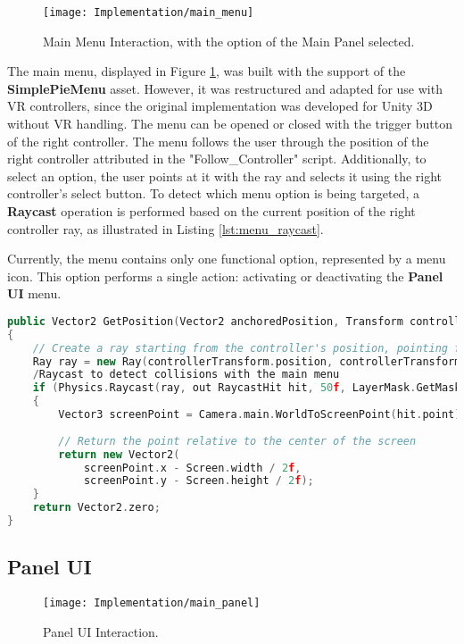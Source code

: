  \begin{figure}[h!]
    \centering
    \texttt{[image: Implementation/main\_menu]}
    \caption{Main Menu Interaction, with the option of the Main Panel selected.}
    \label{fig:main_menu}
\end{figure}

The main menu, displayed in Figure \ref{fig:main_menu}, was built with the support of the \textbf{SimplePieMenu} asset.
However, it was restructured and adapted for use with \gls{VR} controllers, since the original implementation was developed for Unity \gls{3D} without \gls{VR} handling.
The menu can be opened or closed with the trigger button of the right controller. The menu follows the user through the position of the right controller attributed in the "Follow\_Controller" script.
Additionally, to select an option, the user points at it with the ray and selects it using the right controller’s select button. To detect which menu option is being targeted, a \textbf{Raycast} operation is performed based on the current position of the right controller ray, as illustrated in Listing \ref{lst:menu_raycast}.

Currently, the menu contains only one functional option, represented by a menu icon. This option performs a single action: activating or deactivating the \textbf{Panel \gls{UI}} menu.


\begin{lstlisting}[language=C++, caption={Method used to acquire the position that was pointed at by the controller ray.}, label={lst:menu_raycast},float]
public Vector2 GetPosition(Vector2 anchoredPosition, Transform controllerTransform)
{
    // Create a ray starting from the controller's position, pointing forward
    Ray ray = new Ray(controllerTransform.position, controllerTransform.forward);
    /Raycast to detect collisions with the main menu
    if (Physics.Raycast(ray, out RaycastHit hit, 50f, LayerMask.GetMask("Default")))
    {
        Vector3 screenPoint = Camera.main.WorldToScreenPoint(hit.point);
        
        // Return the point relative to the center of the screen
        return new Vector2(
            screenPoint.x - Screen.width / 2f,
            screenPoint.y - Screen.height / 2f);
    }
    return Vector2.zero;
}
\end{lstlisting}



\subsection{Panel \gls{UI}}
\label{sec:panel_UI}
\begin{figure}[h!]
    \centering
    \texttt{[image: Implementation/main\_panel]}
    \caption{Panel \gls{UI} Interaction.}
    \label{fig:main_panel}    
\end{figure}

